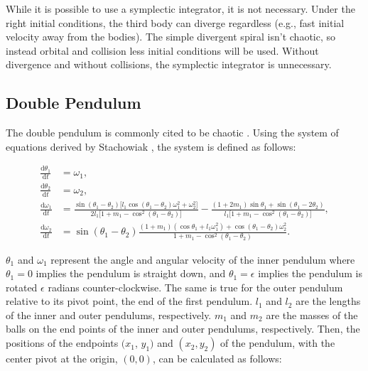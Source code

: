 \documentclass{article}
\newcommand{\der}[2][t]{\frac{\mathrm{d}#2}{\mathrm{d}#1}}
\begin{document}
While it is possible to use a symplectic integrator, it is not necessary.
Under the right initial conditions, the third body can diverge regardless
(e.g., fast initial velocity away from the bodies).
The simple divergent spiral
isn't chaotic, so instead orbital and collision less initial conditions will
be used. Without divergence and without collisions, the symplectic integrator
is unnecessary.

\subsection{Double Pendulum}

The double pendulum is commonly cited to be chaotic
\cite{stachowiak2006numerical} \cite{levien1993double}. Using the system of
equations derived by Stachowiak \cite{stachowiak2006numerical}, the system is
defined as follows:

\begin{align}
    \der{\theta_1} &= \omega_1, \nonumber \\
    \der{\theta_2} &= \omega_2, \nonumber \\
    \der{\omega_1} &= 
    \frac{
        \sin(\theta_1 - \theta_2) \lbrack
            l_1 \cos(\theta_1 - \theta_2) \omega_1^2 + \omega_2^2
        \rbrack
    }{
        2 l_1 \lbrack
            1 + m_1 - \cos^2(\theta_1 - \theta_2)
        \rbrack
    }
    -
    \frac{
        (1 + 2 m_1) \sin \theta_1 + \sin(\theta_1 - 2 \theta_2)
    }{
        l_1 \lbrack
            1 + m_1 - \cos^2(\theta_1 - \theta_2)
        \rbrack
    }
    , \nonumber \\
    \der{\omega_2} &= \sin (\theta_1 - \theta_2) 
    \frac{
        (1+m_1) (\cos \theta_1 + l_1 \omega_1^2)
        +
        \cos(\theta_1 - \theta_2) \omega_2^2
    }{
        1 + m_1 - \cos^2(\theta_1 - \theta_2)
    }. \label{eq:doub_pen}
\end{align}

$\theta_1$ and $\omega_1$ represent the angle and angular velocity of the
inner pendulum where $\theta_1=0$ implies the pendulum is straight down, and
$\theta_1=\epsilon$ implies the pendulum is rotated $\epsilon$ radians
counter-clockwise. The same is true for the outer pendulum relative to its
pivot point, the end of the first pendulum. $l_1$ and $l_2$ are the lengths
of the inner and outer pendulums, respectively. $m_1$ and $m_2$ are the
masses of the balls on the end points of the inner and outer pendulums,
respectively. Then, the positions of the endpoints $(x_1$, $y_1)$ and $(x_2,
y_2)$ of the pendulum, with the center pivot at the origin, $(0, 0)$, can be
calculated as follows:
\end{document}
